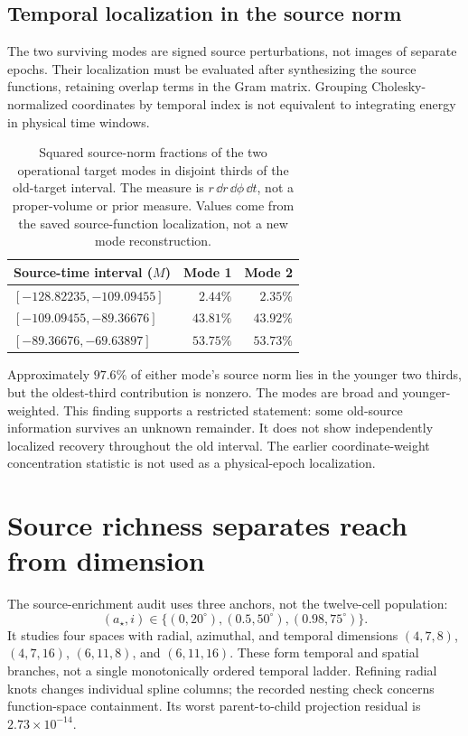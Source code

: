 \subsection{Temporal localization in the source norm}
The two surviving modes are signed source perturbations, not images of separate epochs. Their localization must be evaluated after synthesizing the source functions, retaining overlap terms in the Gram matrix. Grouping Cholesky-normalized coordinates by temporal index is not equivalent to integrating energy in physical time windows.

\begin{table}[htbp]
\centering\small
\caption{Squared source-norm fractions of the two operational target modes in disjoint thirds of the old-target interval. The measure is $r\,\dd r\,\dd\phi\,\dd t$, not a proper-volume or prior measure. Values come from the saved source-function localization, not a new mode reconstruction.}
\label{tab:localization}
\begin{tabular}{l r r}
\toprule
Source-time interval ($M$)&Mode 1&Mode 2\\
\midrule
$[-128.82235,-109.09455]$&$2.44\%$&$2.35\%$\\
$[-109.09455,-89.36676]$&$43.81\%$&$43.92\%$\\
$[-89.36676,-69.63897]$&$53.75\%$&$53.73\%$\\
\bottomrule
\end{tabular}
\end{table}

Approximately $97.6\%$ of either mode's source norm lies in the younger two thirds, but the oldest-third contribution is nonzero. The modes are broad and younger-weighted. This finding supports a restricted statement: some old-source information survives an unknown remainder. It does not show independently localized recovery throughout the old interval. The earlier coordinate-weight concentration statistic is not used as a physical-epoch localization.

\section{Source richness separates reach from dimension}\label{sec:stress}
The source-enrichment audit uses three anchors, not the twelve-cell population:
\begin{equation}
(a_\star,i)\in\{(0,20^\circ),(0.5,50^\circ),(0.98,75^\circ)\}.
\label{eq:threeanchors}
\end{equation}
It studies four spaces with radial, azimuthal, and temporal dimensions $(4,7,8)$, $(4,7,16)$, $(6,11,8)$, and $(6,11,16)$. These form temporal and spatial branches, not a single monotonically ordered temporal ladder. Refining radial knots changes individual spline columns; the recorded nesting check concerns function-space containment. Its worst parent-to-child projection residual is $2.73\times10^{-14}$.


